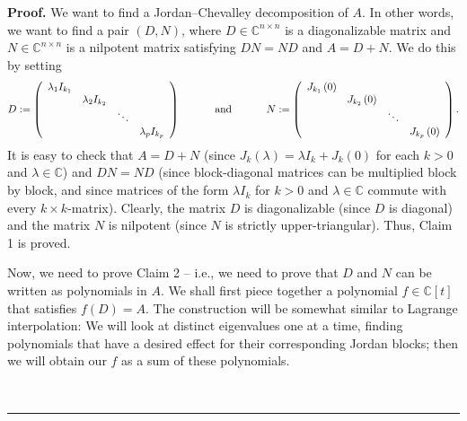 \documentclass[numbers=enddot,12pt,final,onecolumn,notitlepage]{scrartcl}%
\numberwithin{exer}{subsection}
\theoremstyle{definition}
\newenvironment{proof}[1][Proof]{\noindent\textbf{#1.} }{\ \rule{0.5em}{0.5em}}
\newenvironment{noncompile}{}{}
\begin{document}
\begin{proof}
We want to find a Jordan--Chevalley decomposition of $A$. In other words, we
want to find a pair $\left(  D,N\right)  $, where $D\in\mathbb{C}^{n\times n}$
is a diagonalizable matrix and $N\in\mathbb{C}^{n\times n}$ is a nilpotent
matrix satisfying $DN=ND$ and $A=D+N$. We do this by setting%
\[
D:=\left(
\begin{array}
[c]{cccc}%
\lambda_{1}I_{k_{1}} &  &  & \\
& \lambda_{2}I_{k_{2}} &  & \\
&  & \ddots & \\
&  &  & \lambda_{p}I_{k_{p}}%
\end{array}
\right)  \ \ \ \ \ \ \ \ \ \ \text{and}\ \ \ \ \ \ \ \ \ \ N:=\left(
\begin{array}
[c]{cccc}%
J_{k_{1}}\left(  0\right)  &  &  & \\
& J_{k_{2}}\left(  0\right)  &  & \\
&  & \ddots & \\
&  &  & J_{k_{p}}\left(  0\right)
\end{array}
\right)  .
\]
It is easy to check that $A=D+N$ (since $J_{k}\left(  \lambda\right)  =\lambda
I_{k}+J_{k}\left(  0\right)  $ for each $k>0$ and $\lambda\in\mathbb{C}$) and
$DN=ND$ (since block-diagonal matrices can be multiplied block by block, and
since matrices of the form $\lambda I_{k}$ for $k>0$ and $\lambda\in
\mathbb{C}$ commute with every $k\times k$-matrix). Clearly, the matrix $D$ is
diagonalizable (since $D$ is diagonal) and the matrix $N$ is nilpotent (since
$N$ is strictly upper-triangular). Thus, Claim 1 is proved.

\begin{noncompile}
Now, we need to prove Claim 2 -- i.e., we need to prove that $D$ and $N$ can
be written as polynomials in $A$. We shall first piece together a polynomial
$f\in\mathbb{C}\left[  t\right]  $ that satisfies $f\left(  D\right)  =A$. The
construction will be somewhat similar to Lagrange interpolation: We will look
at distinct eigenvalues one at a time, finding polynomials that have a desired
effect for their corresponding Jordan blocks; then we will obtain our $f$ as a
sum of these polynomials.


\end{noncompile}
\end{proof}
\end{document}
